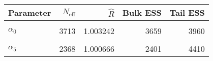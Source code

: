 \begin{table}[!h]
\centering
\begin{tabular}{>{\raggedright\arraybackslash}p{2cm}rrrr}
\toprule
Parameter & $N_{\text{eff}}$ & $\widehat{R}$ & Bulk ESS & Tail ESS\\
\midrule
\cellcolor{gray!6}{$\rho$} & \cellcolor{gray!6}{43474} & \cellcolor{gray!6}{1.000006} & \cellcolor{gray!6}{43525} & \cellcolor{gray!6}{44197}\\
$\alpha_{0}$ & 3713 & 1.003242 & 3659 & 3960\\
\cellcolor{gray!6}{$\alpha_{2}$} & \cellcolor{gray!6}{3897} & \cellcolor{gray!6}{1.003317} & \cellcolor{gray!6}{3931} & \cellcolor{gray!6}{4091}\\
$\alpha_{5}$ & 2368 & 1.000666 & 2401 & 4410\\
\bottomrule
\end{tabular}
\end{table}
